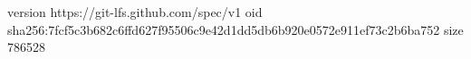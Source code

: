 version https://git-lfs.github.com/spec/v1
oid sha256:7fcf5c3b682c6ffd627f95506c9e42d1dd5db6b920e0572e911ef73c2b6ba752
size 786528
